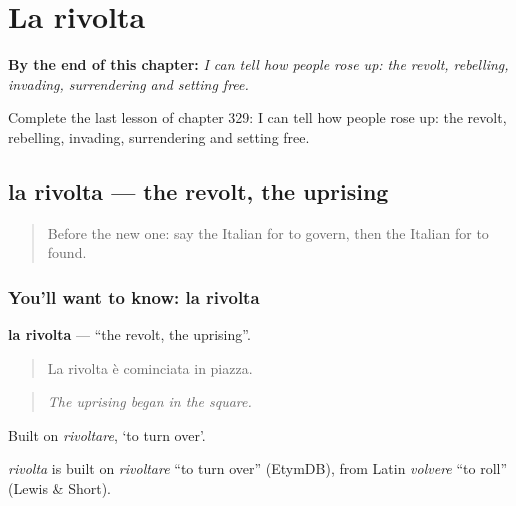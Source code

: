 
\chapter{La rivolta}
\label{ch:it-la-rivolta}

\begin{chapteropening}
\textbf{By the end of this chapter:} \emph{I can tell how people rose up: the revolt, rebelling, invading, surrendering and setting free.}

Complete the last lesson of chapter 329: I can tell how people rose up: the revolt, rebelling, invading, surrendering and setting free.
\end{chapteropening}

\section[la rivolta]{la rivolta — the revolt, the uprising}

\label{lesson:IT-C329-rivolta}



\begin{quote}
Before the new one: say the Italian for to govern, then the Italian for to found.
\end{quote}

\subsection*{You'll want to know: la rivolta}
\textbf{la rivolta} — \textquotedblleft{}the revolt, the uprising\textquotedblright{}.

\begin{quote}
La rivolta è cominciata in piazza.
\end{quote}

\begin{quote}
\emph{The uprising began in the square.}
\end{quote}

Built on \emph{rivoltare}, ‘to turn over’.

\begin{cousinweb}
\emph{rivolta} is built on \emph{rivoltare} \textquotedblleft{}to turn over\textquotedblright{} (EtymDB), from Latin \emph{volvere} \textquotedblleft{}to roll\textquotedblright{} (Lewis \& Short).
\end{cousinweb}

